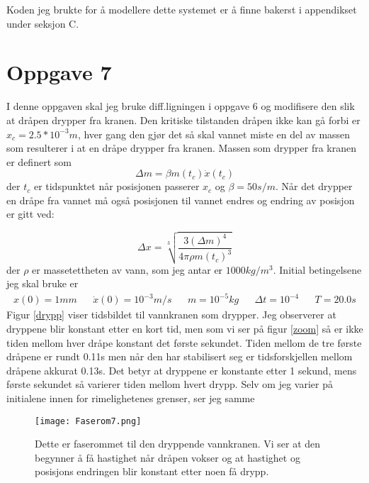 \documentclass[norsk,a4paper,12pt]{article}
\begin{document}
Koden jeg brukte for å modellere dette systemet er å finne bakerst i appendikset under seksjon C.

\section{Oppgave 7}
I denne oppgaven skal jeg bruke diff.ligningen i oppgave 6 og modifisere den slik at dråpen drypper fra kranen. Den kritiske tilstanden dråpen ikke kan gå forbi er $x_c = 2.5*10^{-3}m$, hver gang den gjør det så skal vannet miste en del av massen som resulterer i at en dråpe drypper fra kranen. Massen som drypper fra kranen er definert som 
$$
\Delta m = \beta m(t_c)\dot{x}(t_c)
$$
der $t_c$ er tidspunktet når posisjonen passerer $x_c$ og $\beta = 50 s/m$. Når det drypper en dråpe fra vannet må også posisjonen til vannet endres og endring av posisjon er gitt ved:

$$
\Delta x = \sqrt[3]{\frac{3(\Delta m)^4}{4\pi\rho m(t_c)^3}}
$$
der $\rho$ er massetettheten av vann, som jeg antar er $1000 kg/m^3$. Initial betingelsene jeg skal bruke er
\begin{align*}
x(0) = 1 mm && \dot{x}(0) = 10^{-3}m/s && m = 10^{-5} kg && \Delta t = 10^{-4} && T = 20.0s
\end{align*}
Figur \vref{drypp} viser tidsbildet til vannkranen som drypper. Jeg observerer at dryppene blir konstant etter en kort tid, men som vi ser på figur \vref{zoom} så er ikke tiden mellom hver dråpe konstant det første sekundet. Tiden mellom de tre første dråpene er rundt 0.11s men når den har stabilisert seg er tidsforskjellen mellom dråpene akkurat 0.13s. Det betyr at dryppene er konstante etter 1 sekund, mens første sekundet så varierer tiden mellom hvert drypp. Selv om jeg varier på initialene innen for rimelighetenes grenser, ser jeg samme 

\begin{figure}
\centering
\texttt{[image: Faserom7.png]}
\caption[Faserommet av vannkranen som drypper]{Dette er faserommet til den dryppende vannkranen. Vi ser at den begynner å få hastighet når dråpen vokser og at hastighet og posisjons endringen blir konstant etter noen få drypp.}
\label{Faserom7}
\end{figure}
\end{document}
